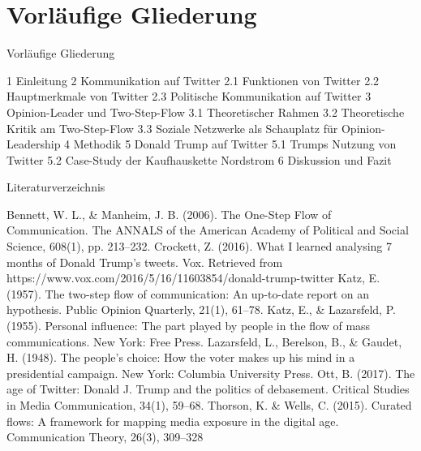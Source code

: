 \section{Vorläufige Gliederung}
\label{sec:vorlaufige-gliederung}


Vorläufige Gliederung

    1 Einleitung
    2 Kommunikation auf Twitter
        2.1 Funktionen von Twitter
        2.2 Hauptmerkmale von Twitter
        2.3 Politische Kommunikation auf Twitter
    3 Opinion-Leader und Two-Step-Flow
        3.1 Theoretischer Rahmen
        3.2 Theoretische Kritik am Two-Step-Flow
        3.3 Soziale Netzwerke als Schauplatz für Opinion-Leadership
    4 Methodik
    5 Donald Trump auf Twitter
        5.1 Trumps Nutzung von Twitter
        5.2 Case-Study der Kaufhauskette Nordstrom
    6 Diskussion und Fazit

Literaturverzeichnis

    Bennett, W. L., \& Manheim, J. B. (2006). The One-Step Flow of Communication. The ANNALS of the American Academy of Political and Social Science, 608(1), pp. 213–232.
    Crockett, Z. (2016). What I learned analysing 7 months of Donald Trump’s tweets. Vox. Retrieved from https://www.vox.com/2016/5/16/11603854/donald-trump-twitter
    Katz, E. (1957). The two-step flow of communication: An up-to-date report on an hypothesis. Public Opinion Quarterly, 21(1), 61–78.
    Katz, E., \& Lazarsfeld, P. (1955). Personal influence: The part played by people in the flow of mass communications. New York: Free Press.
    Lazarsfeld, L., Berelson, B., \& Gaudet, H. (1948). The people’s choice: How the voter makes up his mind in a presidential campaign. New York: Columbia University Press.
    Ott, B. (2017). The age of Twitter: Donald J. Trump and the politics of debasement. Critical Studies in Media Communication, 34(1), 59–68.
    Thorson, K. \& Wells, C. (2015). Curated flows: A framework for mapping media exposure in the digital age. Communication Theory, 26(3), 309–328